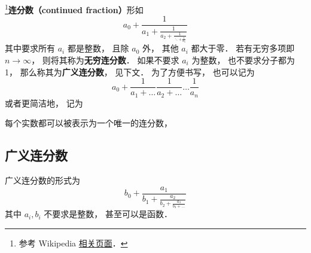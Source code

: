 
\footnote{参考 Wikipedia \href{https://en.wikipedia.org/wiki/Continued_fraction}{相关页面}．}\textbf{连分数（continued fraction）}形如
\begin{equation}
a_0 + \frac{1}{\displaystyle a_1 + \frac{1}{\displaystyle a_2 + \frac{1}{\displaystyle \ddots + \frac{1}{a_n}}}}
\end{equation}
其中要求所有 $a_i$ 都是整数， 且除 $a_0$ 外， 其他 $a_i$ 都大于零． 若有无穷多项即 $n\to\infty$， 则将其称为\textbf{无穷连分数}． 如果不要求 $a_i$ 为整数， 也不要求分子都为 1， 那么称其为\textbf{广义连分数}， 见下文． 为了方便书写， 也可以记为
\begin{equation}
a_0 + \frac{1}{a_1 + \dots}\frac{1}{a_2 + \dots}\dots \frac{1}{a_n}
\end{equation}
或者更简洁地， 记为
\begin{equation}
[a_0; a_1, a_2, \dots, a_n]
\end{equation}

每个实数都可以被表示为一个唯一的连分数， 


\subsection{广义连分数}
广义连分数的形式为
\begin{equation}
b_0 + \frac{a_1}{\displaystyle b_1 + \frac{a_2}{\displaystyle b_2 + \frac{a_3}{\displaystyle b_3 + \dots}}}
\end{equation}
其中 $a_i, b_i$ 不要求是整数， 甚至可以是函数．
